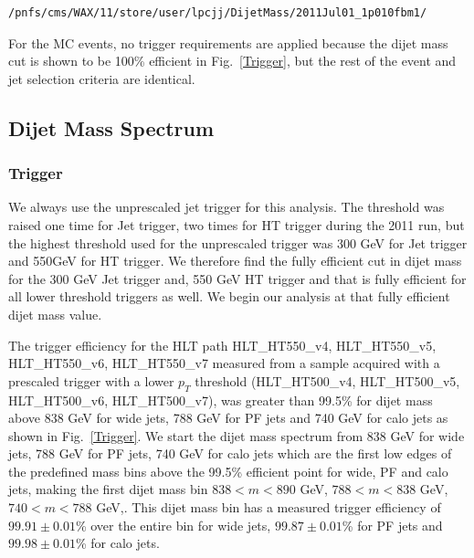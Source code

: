 \begin{verbatim}
/pnfs/cms/WAX/11/store/user/lpcjj/DijetMass/2011Jul01_1p010fbm1/
\end{verbatim} 

For the MC events, no trigger requirements are applied because the
dijet mass cut is shown to be 100\% efficient in Fig.~\ref{Trigger},
but the rest of the event and jet selection criteria are identical.
\subsection{Dijet Mass Spectrum}

\subsubsection{Trigger}

We always use the unprescaled jet trigger for this analysis. The
threshold was raised one time for Jet trigger, two times for HT trigger 
during the 2011 run, but the highest threshold used for the unprescaled
trigger was 300 GeV for Jet trigger and 550GeV for HT trigger.  We therefore
find the fully efficient cut in dijet mass for the 300 GeV Jet trigger and,
550 GeV HT trigger and that is fully efficient for all lower threshold triggers
as well. We begin our analysis at that fully efficient dijet mass value.

The trigger efficiency for the HLT path HLT\_HT550\_v4, HLT\_HT550\_v5,
HLT\_HT550\_v6, HLT\_HT550\_v7 measured from a sample acquired with
a prescaled trigger with a lower $p_T$ threshold (HLT\_HT500\_v4,
HLT\_HT500\_v5, HLT\_HT500\_v6, HLT\_HT500\_v7), was greater than
99.5\% for dijet mass above 838 GeV for wide jets, 788 GeV for PF jets
and 740 GeV for calo jets as shown in Fig.~\ref{Trigger}. We start
the dijet mass spectrum from 838 GeV for wide jets, 788 GeV for PF jets,
740 GeV for calo jets which are the first low edges of the predefined mass
bins above the 99.5\% efficient point for wide, PF and calo jets, making the
first dijet mass bin $838<m<890$ GeV, $788<m<838$ GeV, $740<m<788$ GeV,.
This dijet mass bin has a measured trigger efficiency of $99.91\pm0.01$\%
over the entire bin for wide jets, $99.87\pm0.01$\% for PF jets and
$99.98\pm0.01$\% for calo jets.

